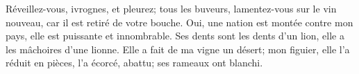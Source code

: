 Réveillez-vous, ivrognes, et pleurez;
	tous les buveurs, lamentez-vous sur le vin nouveau, car il est retiré de votre bouche.
Oui, une nation est montée contre mon pays, elle est puissante et innombrable.
	Ses dents sont les dents d’un lion, elle a les mâchoires d’une lionne.
Elle a fait de ma vigne un désert;
	mon figuier, elle l’a réduit en pièces, l’a écorcé, abattu; ses rameaux ont blanchi.
